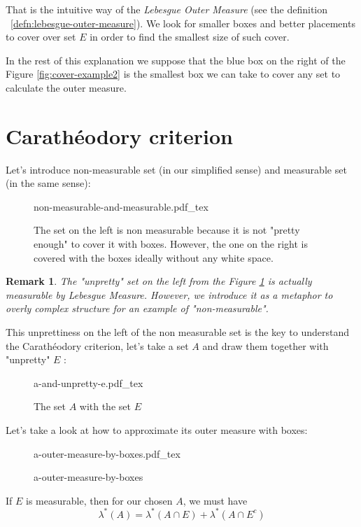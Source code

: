 \documentclass[a4paper]{article}
\newcommand{\incfig}[1]{%
    \def\svgwidth{\columnwidth}
    {#1.pdf_tex}
}
\newtheorem*{remark}{Remark}
\begin{document}
That is the intuitive way of the \textit{Lebesgue Outer Measure} (see the
definition ~\ref{defn:lebesgue-outer-measure}). We look for smaller boxes and
better placements to cover over set $E$ in order to find the smallest size of
such cover.

In the rest of this explanation we suppose that the blue box on the right of
the Figure \ref{fig:cover-example2} is the smallest box we can take to cover any set
to calculate the outer measure.

\section{Carathéodory criterion}
Let's introduce non-measurable set (in our simplified
sense) and measurable set (in the same sense):
\begin{figure}[H]
    \centering
    \incfig{non-measurable-and-measurable}
    \caption{The set on the left is non measurable because it is not "pretty
    enough" to cover it with boxes. However, the one on the right is covered
with the boxes ideally without any white space.}
    \label{fig:non-measurable-and-measurable}
\end{figure}

\begin{remark}
    The "unpretty" set on the left from the Figure
    \ref{fig:non-measurable-and-measurable} is actually measurable by Lebesgue
    Measure. However, we introduce it as a metaphor to overly complex structure 
    for an example of "non-measurable".
\end{remark}

This unprettiness on the left of the non measurable set is the key to
understand the Carathéodory criterion, let's take a set $A$ and draw them
together with "unpretty" $E$ :

\begin{figure}[H]
    \centering
    \incfig{a-and-unpretty-e}
    \caption{The set $A$ with the set  $E$}
    \label{fig:a-and-unpretty-e}
\end{figure}

Let's take a look at how to approximate its outer measure with boxes:
\begin{figure}[H]
    \centering
    \incfig{a-outer-measure-by-boxes}
    \caption{a-outer-measure-by-boxes}
    \label{fig:a-outer-measure-by-boxes}
\end{figure}

If $E$ is measurable, then for our chosen  $A$, we must have
 \[
\lambda^*(A) = \lambda^*(A \cap E) + \lambda^*(A \cap E^c)
\] 
\end{document}
